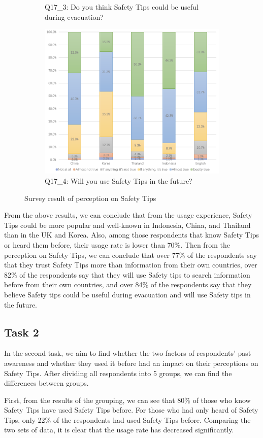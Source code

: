 \begin{figure}[h]
\begin{subfigure}{0.48\textwidth}
  \centering
  \caption{Q17\_3: Do you think Safety Tips could be useful during evacuation?}
  \label{fig17}
  \end{subfigure}\hfill
  \begin{subfigure}{0.48\textwidth}
  \includegraphics[width=0.6\linewidth]{Figure/Figure18.jpg}
  \centering
  \caption{Q17\_4: Will you use Safety Tips in the future?}
  \label{fig18}
  \end{subfigure}
  \caption{Survey result of perception on Safety Tips}
\end{figure}



From the above results, we can conclude that from the usage experience, Safety Tips could be more popular and well-known in Indonesia, China, and Thailand than in the UK and Korea. Also, among those respondents that know Safety Tips or heard them before, their usage rate is lower than 70\%. Then from the perception on Safety Tips, we can conclude that over 77\% of the respondents say that they trust Safety Tips more than information from their own countries, over 82\% of the respondents say that they will use Safety tips to search information before from their own countries, and over 84\% of the respondents say that they believe Safety tips could be useful during evacuation and will use Safety tips in the future.


\subsection{Task 2}
In the second task, we aim to find whether the two factors of respondents' past awareness and whether they used it before had an impact on their perceptions on Safety Tips. After dividing all respondents into 5 groups, we can find the differences between groups. 

First, from the results of the grouping, we can see that 80\% of those who know Safety Tips have used Safety Tips before. For those who had only heard of Safety Tips, only 22\% of the respondents had used Safety Tips before. Comparing the two sets of data, it is clear that the usage rate has decreased significantly.

